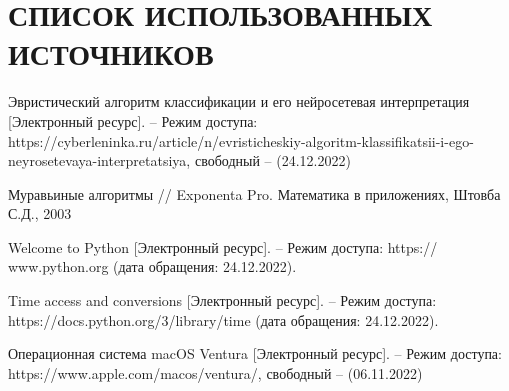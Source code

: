 \section*{СПИСОК ИСПОЛЬЗОВАННЫХ ИСТОЧНИКОВ}

\begingroup
\renewcommand{\section}[2]{}

\begin{thebibliography}{10}
	Эвристический алгоритм классификации и его нейросетевая интерпретация [Электронный ресурс]. -- Режим доступа:  
	https://cyberleninka.ru/article/n/evristicheskiy-algoritm-klassifikatsii-i-ego-neyrosetevaya-interpretatsiya,
	свободный -- (24.12.2022)
	
	 Муравьиные алгоритмы // Exponenta Pro. Математика в приложениях,
	 Штовба С.Д.,
	 2003
	 
	 Welcome to Python [Электронный ресурс]. -- Режим доступа:  
	  https:// www.python.org (дата обращения: 24.12.2022).
	
	 Time access and conversions  [Электронный ресурс]. -- Режим доступа: 
	 https://docs.python.org/3/library/time (дата обращения: 24.12.2022).	
	
	Операционная система macOS Ventura  [Электронный ресурс]. – Режим доступа: 
	https://www.apple.com/macos/ventura/, 
	свободный -- (06.11.2022)

\end{thebibliography}
\endgroup

\pagebreak





